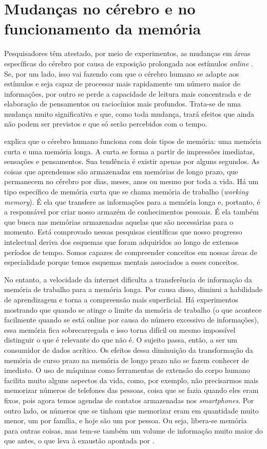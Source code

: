 \section{Mudanças no cérebro e no funcionamento da memória}\label{sec-mudançasnocerebroenofuncionamentodamemoria}

Pesquisadores têm atestado, por meio de experimentos, as mudanças em áreas específicas do cérebro por causa de exposição prolongada aos estímulos \textit{online} \cite{bbc2021}.  Se, por um lado, isso vai fazendo com que o cérebro humano se adapte aos estímulos e seja capaz de processar mais rapidamente um número maior de informações, por outro se perde a capacidade de leitura mais concentrada e de elaboração de pensamentos ou raciocínios mais profundos. Trata-se de uma mudança muito significativa e que, como toda mudança, trará efeitos que ainda não podem ser previstos e que só serão percebidos com o tempo.

\textcite[p. 123]{carr2010} explica que o cérebro humano funciona com dois tipos de memória: uma memória curta e uma memória longa. A curta se forma a partir de impressões imediatas, sensações e pensamentos. Sua tendência é existir apenas por alguns segundos. As coisas que aprendemos são armazenadas em memórias de longo prazo, que permanecem no cérebro por dias, meses, anos ou mesmo por toda a vida. Há um tipo específico de memória curta que se chama memória de trabalho (\textit{working memory}). É ela que transfere as informações para a memória longa e, portanto, é a responsável por criar nosso armazém de conhecimentos pessoais. É ela também que busca nas memórias armazenadas aquelas que são necessárias para o momento. Está comprovado nessas pesquisas científicas que nosso progresso intelectual deriva dos esquemas que foram adquiridos ao longo de extensos períodos de tempo. Somos capazes de compreender conceitos em nossas áreas de especialidade porque temos esquemas mentais associados a esses conceitos. 

No entanto, a velocidade da internet dificulta a transferência de informação da memória de trabalho para a memória longa. Por causa disso, diminui a habilidade de aprendizagem e torna a compreensão mais superficial. Há experimentos mostrando que quando se atinge o limite da memória de trabalho (o que acontece facilmente quando se está online por causa do número excessivo de informações), essa memória fica sobrecarregada e isso torna difícil ou mesmo impossível distinguir o que é relevante do que não é. O sujeito passa, então, a ser um consumidor de dados acrítico. Os efeitos dessa diminuição da transformação da memória de curso prazo na memória de longo prazo não se fazem conhecer de imediato. O uso de máquinas como ferramentas de extensão do corpo humano facilita muito alguns aspectos da vida, como, por exemplo, não precisarmos mais memorizar números de telefones das pessoas, coisa que se fazia quando eles eram fixos, pois agora temos agendas de contatos armazenadas nos \textit{smartphones}. Por outro lado, os números que se tinham que memorizar eram em quantidade muito menor, um por família, e hoje são um por pessoa. Ou seja, libera-se memória para outras coisas, mas tem-se também um volume de informação muito maior do que antes, o que leva à exaustão apontada por \textcite{carr2010}. 


